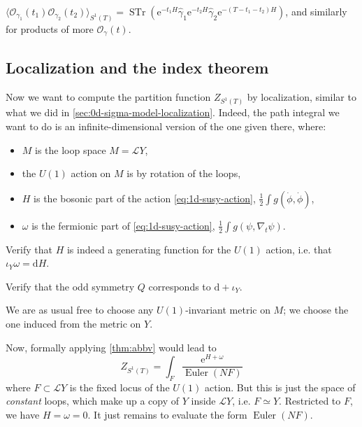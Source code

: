\documentclass[12pt,letterpaper,reqno]{article}
\numberwithin{equation}{section}
\newcommand{\cL}{\ensuremath{\mathcal L}}
\newcommand{\cO}{\ensuremath{\mathcal O}}
\newcommand{\half}{\ensuremath{\frac{1}{2}}}
\newcommand{\e}{{\mathrm e}}
\newcommand{\de}{\mathrm{d}}
\newcommand{\IP}[1]{\langle#1\rangle}
\newcommand{\ti}[1]{\textit{#1}}
\DeclareMathOperator{\STr}{STr}
\DeclareMathOperator{\Euler}{Euler}
\newcommand{\fixme}[1]{{\color{orange}{[#1]}}}
\begin{document}
\begin{prop} 
$\IP{\cO_{\gamma_1}(t_1) \cO_{\gamma_2}(t_2)}_{S^1(T)} = \STr (\e^{-t_1 H} \hat\gamma_1 \e^{-t_2 H} \hat\gamma_2 \e^{-(T-t_1-t_2)H})$,
and similarly for products of more $\cO_\gamma(t)$.
\end{prop}

\fixme{give some sketch proof? discretization?}

\fixme{supercurrent which maps to the Dirac operator}


\subsection{Localization and the index theorem} \label{sec:localization-index}

Now we want to compute the partition function $Z_{S^1(T)}$ by localization,
similar to what we did in \autoref{sec:0d-sigma-model-localization}.
Indeed, the path integral we want to do is an infinite-dimensional
version of the one given there, where:
\begin{itemize} 
\item $M$ is the loop space $M = \cL Y$,
\item the $U(1)$ action on $M$ is by rotation of the loops,
\item $H$ is the bosonic part of the action \eqref{eq:1d-susy-action}, $\half \int g(\dot\phi,\dot\phi)$,
\item $\omega$ is the fermionic part of \eqref{eq:1d-susy-action}, $\half \int g(\psi, \nabla_t \psi)$.
\end{itemize}

\begin{exercise} Verify that $H$ is indeed a generating function for the $U(1)$ action, i.e.
that $\iota_Y \omega = \de H$. \fixme{watch out for factor of 2 here}
\end{exercise}

\begin{exercise} Verify that the odd symmetry $Q$ corresponds to $\de + \iota_Y$.
\end{exercise}
\fixme{notation problem: used $Y$ for the vector field earlier, now using it for target}

We are as usual free to choose any $U(1)$-invariant metric on $M$; we choose the
one induced from the metric on $Y$.

Now, formally applying \autoref{thm:abbv} would lead to
\begin{equation} \label{eq:zs1-abbv-formal}
  Z_{S^1(T)} = \int_F \frac{\e^{H + \omega}}{\Euler(NF)}
\end{equation}
where $F \subset \cL Y$ is the fixed locus of the $U(1)$ action.
But this is just the space of \ti{constant} loops,
which make up a copy of $Y$ inside $\cL Y$, i.e. $F \simeq Y$.
Restricted to $F$, we have $H = \omega = 0$. It just 
remains to evaluate the form $\Euler(NF)$. 
\end{document}
